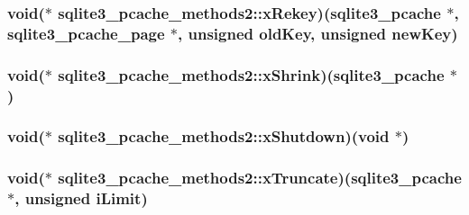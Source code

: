 \hypertarget{structsqlite3__pcache__methods2_a28a22927b108182e22025bbe6ba1f68e}{
\subsubsection[{x\-Rekey}]{\setlength{\rightskip}{0pt plus 5cm}void($\ast$ sqlite3\-\_\-pcache\-\_\-methods2\-::x\-Rekey)({\bf sqlite3\-\_\-pcache} $\ast$, {\bf sqlite3\-\_\-pcache\-\_\-page} $\ast$, unsigned old\-Key, unsigned new\-Key)}}\label{structsqlite3__pcache__methods2_a28a22927b108182e22025bbe6ba1f68e}
\hypertarget{structsqlite3__pcache__methods2_af00c121e9c39b1df292711013c226ba5}{
\subsubsection[{x\-Shrink}]{\setlength{\rightskip}{0pt plus 5cm}void($\ast$ sqlite3\-\_\-pcache\-\_\-methods2\-::x\-Shrink)({\bf sqlite3\-\_\-pcache} $\ast$)}}\label{structsqlite3__pcache__methods2_af00c121e9c39b1df292711013c226ba5}
\hypertarget{structsqlite3__pcache__methods2_a00a780e295b89976940cd3cba2cfeaee}{
\subsubsection[{x\-Shutdown}]{\setlength{\rightskip}{0pt plus 5cm}void($\ast$ sqlite3\-\_\-pcache\-\_\-methods2\-::x\-Shutdown)(void $\ast$)}}\label{structsqlite3__pcache__methods2_a00a780e295b89976940cd3cba2cfeaee}
\hypertarget{structsqlite3__pcache__methods2_a7c565709ab91dbe7feb5b82c684ba604}{
\subsubsection[{x\-Truncate}]{\setlength{\rightskip}{0pt plus 5cm}void($\ast$ sqlite3\-\_\-pcache\-\_\-methods2\-::x\-Truncate)({\bf sqlite3\-\_\-pcache} $\ast$, unsigned i\-Limit)}}\label{structsqlite3__pcache__methods2_a7c565709ab91dbe7feb5b82c684ba604}
